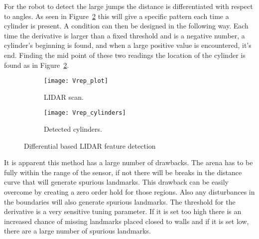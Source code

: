 For the robot to detect the large jumps the distance is differentiated with respect to angles. As seen in Figure~\ref{fig:Vrep_cylinders} this will give a specific pattern each time a cylinder is present. A condition can then be designed in the following way. Each time the derivative is larger than a fixed threshold and is a negative number, a cylinder's beginning is found, and when a large positive value is encountered, it's end. Finding the mid point of these two readings the location of the cylinder is found as in Figure~\ref{fig:Vrep_cylinders}. 
\begin{figure}
        \centering

        \begin{subfigure}[b]{0.48\textwidth}
                \texttt{[image: Vrep\_plot]}
                \caption{LIDAR scan.}
                \label{fig:Vrep_plot}
        \end{subfigure}
        \quad %
        \quad %
        \begin{subfigure}[b]{0.48\textwidth}
                \texttt{[image: Vrep\_cylinders]}
                \caption{Detected cylinders.}
                \label{fig:Vrep_cylinders}
        \end{subfigure}

        \caption{Differential based LIDAR feature detection}\label{fig:Simulated_2}
\end{figure}

It is apparent this method has a large number of drawbacks. The arena has to be fully within the range of the sensor, if not there will be breaks in the distance curve that will generate spurious landmarks. This drawback can be easily overcome by creating a zero order hold for those regions. Also any disturbances in the boundaries will also generate spurious landmarks. The threshold for the derivative is a very sensitive tuning parameter. If it is set too high there is an increased chance of missing landmarks placed closed to walls and if it is set low, there are a large number of spurious landmarks. 

